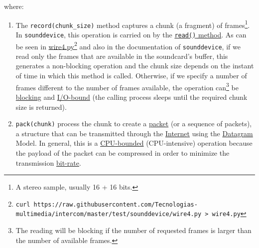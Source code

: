 
where:

\begin{enumerate}
\item The \verb|record(chunk_size)| method captures a chunk (a
  fragment) of frames\footnote{A stereo sample, usually 16 + 16
    bits.}. In \verb|sounddevice|, this operation is carried on by the
  \href{https://python-sounddevice.readthedocs.io/en/0.4.0/api/streams.html#sounddevice.Stream.read}{\texttt{read()}
    method}. As can be seen in
  \href{https://raw.githubusercontent.com/Tecnologias-multimedia/intercom/master/test/sounddevice/wire4.py}{wire4.py}\footnote{
    \texttt{curl
      https://raw.githubusercontent.com/Tecnologias-multimedia/intercom/master/test/sounddevice/wire4.py
      > wire4.py}} and also in the documentation of
  \verb|sounddevice|, if we read only the frames that are available in
  the soundcard's buffer, this generates a non-blocking operation and
  the chunk size depends on the instant of time in which this method
  is called. Otherwise, if we specify a number of frames different to
  the number of frames available, the operation can\footnote{The
    reading will be blocking if the number of requested frames is
    larger than the number of available frames.} be
  \href{https://python-sounddevice.readthedocs.io/en/0.4.0/api/streams.html#sounddevice.Stream.write}{blocking}
  and \href{https://en.wikipedia.org/wiki/I/O_bound}{I/O-bound} (the
  calling process sleeps until the required chunk size is returned).

\item \verb|pack(chunk)| process the chunk to create a
  \href{https://en.wikipedia.org/wiki/Network_packet}{packet} (or a
  sequence of packets), a structure that can be transmitted through
  the \href{https://en.wikipedia.org/wiki/Internet}{Internet} using the
  \href{https://en.wikipedia.org/wiki/Datagram}{Datagram} Model. In
  general, this is a
  \href{https://en.wikipedia.org/wiki/CPU-bound}{CPU-bounded}
  (CPU-intensive) operation because the payload of the packet can be
  compressed in order to minimize the transmission
  \href{https://en.wikipedia.org/wiki/Bit_rate}{bit-rate}.


\end{enumerate}
